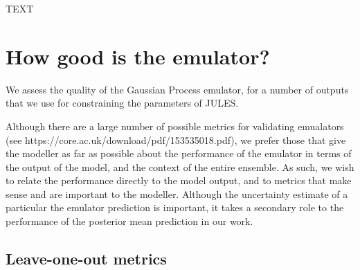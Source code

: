 \documentclass[gmd, manuscript]{copernicus}
\begin{document}
\conclusions  %
TEXT












\appendix



\section{How good is the emulator?}    %

We assess the quality of the Gaussian Process emulator, for a number of outputs that we use for constraining the parameters of JULES.

Although there are a large number of possible metrics  for validating emualators (see https://core.ac.uk/download/pdf/153535018.pdf), we prefer those that give the modeller as far as possible about the performance of the emulator in terms of the output of the model, and the context of the entire ensemble. As such, we wish to relate the performance directly to the model output, and to metrics that make sense and are important to the modeller. Although the uncertainty estimate of a particular the emulator prediction is important, it takes a secondary role to the performance of the posterior mean prediction in our work.

\subsection{Leave-one-out metrics}     %
\end{document}
